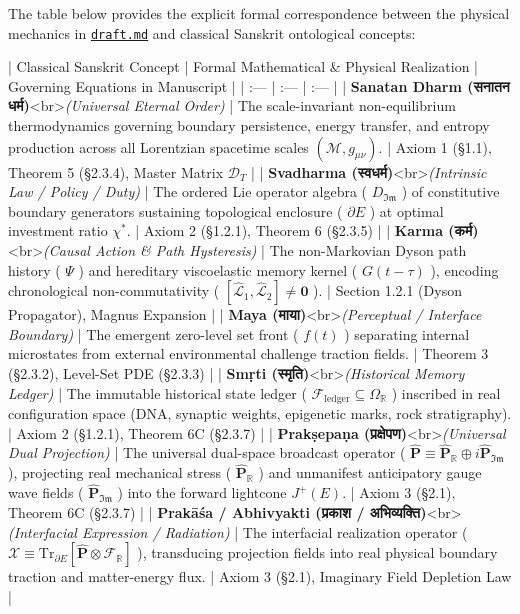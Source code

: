 \documentclass[11pt,a4paper]{article}
\theoremstyle{definition}
\theoremstyle{remark}
\begin{document}
The table below provides the explicit formal correspondence between the physical mechanics in \href{draft.md}{\texttt{draft.md}} and classical Sanskrit ontological concepts:

| Classical Sanskrit Concept | Formal Mathematical \& Physical Realization | Governing Equations in Manuscript |
| :--- | :--- | :--- |
| \textbf{Sanatan Dharm (सनातन धर्म)}<br>\textit{(Universal Eternal Order)} | The scale-invariant non-equilibrium thermodynamics governing boundary persistence, energy transfer, and entropy production across all Lorentzian spacetime scales $(\mathcal{M}, g_{\mu\nu})$. | Axiom 1 (\S 1.1), Theorem 5 (\S 2.3.4), Master Matrix $\mathcal{D}_T$ |
| \textbf{Svadharma (स्वधर्म)}<br>\textit{(Intrinsic Law / Policy / Duty)} | The ordered Lie operator algebra ( $D_{\mathfrak{Im}}$ ) of constitutive boundary generators sustaining topological enclosure ( $\partial E$ ) at optimal investment ratio $\chi^*$. | Axiom 2 (\S 1.2.1), Theorem 6 (\S 2.3.5) |
| \textbf{Karma (कर्म)}<br>\textit{(Causal Action \& Path Hysteresis)} | The non-Markovian Dyson path history ( $\Psi$ ) and hereditary viscoelastic memory kernel ( $G(t-\tau)$ ), encoding chronological non-commutativity ( $[\hat{\mathcal{L}}_1, \hat{\mathcal{L}}_2] \neq \mathbf{0}$ ). | Section 1.2.1 (Dyson Propagator), Magnus Expansion |
| \textbf{Maya (माया)}<br>\textit{(Perceptual / Interface Boundary)} | The emergent zero-level set front ( $f(t)$ ) separating internal microstates from external environmental challenge traction fields. | Theorem 3 (\S 2.3.2), Level-Set PDE (\S 2.3.3) |
| \textbf{Smṛti (स्मृति)}<br>\textit{(Historical Memory Ledger)} | The immutable historical state ledger ( $\mathcal{F}_{\text{ledger}} \subseteq \Omega_{\mathbb{R}}$ ) inscribed in real configuration space (DNA, synaptic weights, epigenetic marks, rock stratigraphy). | Axiom 2 (\S 1.2.1), Theorem 6C (\S 2.3.7) |
| \textbf{Prakṣepaṇa (प्रक्षेपण)}<br>\textit{(Universal Dual Projection)} | The universal dual-space broadcast operator ( $\hat{\mathbf{P}} \equiv \hat{\mathbf{P}}_{\mathbb{R}} \oplus i \hat{\mathbf{P}}_{\mathfrak{Im}}$ ), projecting real mechanical stress ( $\hat{\mathbf{P}}_{\mathbb{R}}$ ) and unmanifest anticipatory gauge wave fields ( $\hat{\mathbf{P}}_{\mathfrak{Im}}$ ) into the forward lightcone $J^+(E)$. | Axiom 3 (\S 2.1), Theorem 6C (\S 2.3.7) |
| \textbf{Prakāśa / Abhivyakti (प्रकाश / अभिव्यक्ति)}<br>\textit{(Interfacial Expression / Radiation)} | The interfacial realization operator ( $\boldsymbol{\mathcal{X}} \equiv \mathrm{Tr}_{\partial E}[\hat{\mathbf{P}} \otimes \mathcal{F}_{\mathbb{R}}]$ ), transducing projection fields into real physical boundary traction and matter-energy flux. | Axiom 3 (\S 2.1), Imaginary Field Depletion Law |
\end{document}
